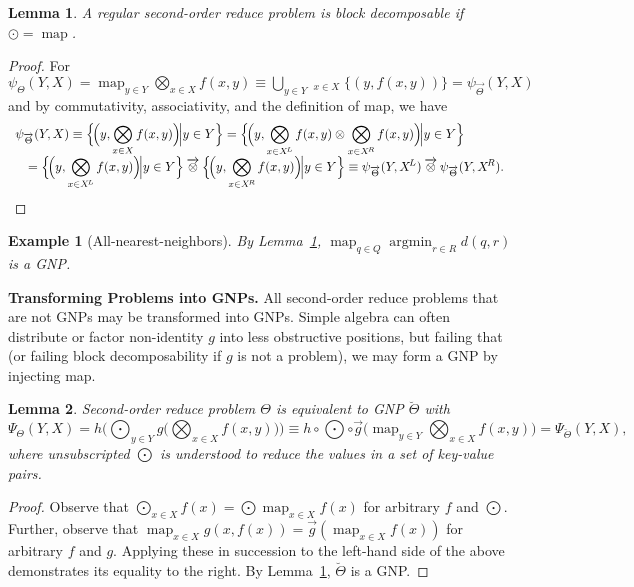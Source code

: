 \documentclass{article}
\newtheorem{lemma}{Lemma}
\newtheorem{example} {Example}
\newcommand{\GNP}[1][\psi]{{#1}_{\Theta}}
\newcommand{\GNPvec}[1][\psi]{{#1}_{\overrightarrow{\Theta}}}
\newcommand{\otimesvec}{\mathbin{\overrightarrow{\otimes}}}
\newcommand{\bigotimesvec}{\mathop{\overrightarrow{\bigotimes}}}
\DeclareMathOperator*{\argmin}{argmin}
\DeclareMathOperator*{\map}{map}
\newcommand{\comp}{\mathbin{\circ}}
\begin{document}
\begin{lemma}\label{lem:map}
  A regular second-order reduce problem is block decomposable if
  $\odot = \map$.
\end{lemma}
\begin{proof}
  For $\GNP(Y,X) = \map_{y \in Y} \bigotimes_{x \in X} f(x,y) \equiv
  \bigcup_{y \in Y} \bigotimesvec_{x \in X} \{(y,f(x,y))\} =
  \GNPvec(Y,X)$ and by commutativity, associativity, and the
  definition of map, we have
  \[ \begin{array}{ll}
    \multicolumn{2}{l}{\displaystyle \GNPvec(Y,X) \equiv \Big\{ \!\Big( y,\bigotimes_{x \in X} f(x,y) \Big)\! \Big| y \in Y \Big\} = \Big\{ \!\Big( y,\bigotimes_{x \in X^{\!L}} f(x,y) \otimes \bigotimes_{x \in X^{\!R}} f(x,y) \Big)\! \Big| y \in Y \Big\}} \\
    & \displaystyle = \Big\{ \!\Big( y,\bigotimes_{x \in X^{\!L}} f(x,y) \Big)\! \Big| y \in Y \Big\} \otimesvec \Big\{ \!\Big( y,\bigotimes_{x \in X^{\!R}} f(x,y) \Big)\! \Big| y \in Y \Big\} \equiv \GNPvec(Y,X^{\!L}) \otimesvec \GNPvec(Y,X^{\!R}).
  \end{array} \]
\end{proof}

\begin{example}[All-nearest-neighbors]
  By Lemma~\ref{lem:map}, $\map_{q \in Q} \argmin_{r \in R} d(q,r)$ is
  a GNP.
\end{example}


{\bf Transforming Problems into GNPs.}  All second-order reduce
problems that are not GNPs may be transformed into GNPs.  Simple
algebra can often distribute or factor non-identity $g$ into less
obstructive positions, but failing that (or failing block
decomposability if $g$ is not a problem), we may form a GNP by
injecting map.
\begin{lemma}
  Second-order reduce problem $\Theta$ is equivalent to GNP
  $\breve{\Theta}$ with
  \[
  \Psi_{\Theta}(Y,X) = h \Big( \bigodot_{y \in Y} g \Big( \bigotimes_{x \in X} f(x,y) \Big) \Big) \equiv h \comp {\textstyle \bigodot} \comp \overrightarrow{g} \Big( \map_{y \in Y} \bigotimes_{x \in X} f(x,y) \Big) = \Psi_{\breve{\Theta}}(Y,X),
  \]
  where unsubscripted $\bigodot$ is understood to reduce the values in
  a set of key-value pairs.
\end{lemma}
\begin{proof}
  Observe that $\bigodot_{x \in X} f(x) = \bigodot{} \map_{x \in X}
  f(x)$ for arbitrary $f$ and $\bigodot$.  Further, observe that
  $\map_{x \in X} g(x,f(x)) = \overrightarrow{g} \left( \map_{x \in X}
  f(x) \right)$ for arbitrary $f$ and $g$.  Applying these in
  succession to the left-hand side of the above demonstrates its
  equality to the right.  By Lemma~\ref{lem:map}, $\breve{\Theta}$ is
  a GNP.
\end{proof}
\end{document}
